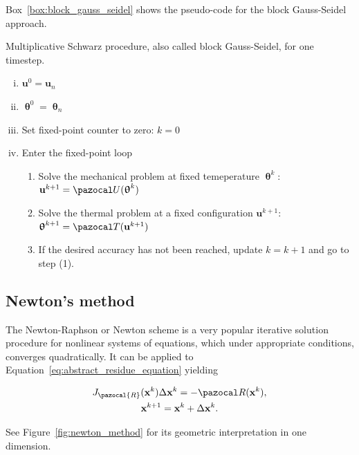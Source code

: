 Box~\ref{box:block_gauss_seidel} shows the pseudo-code for the block Gauss-Seidel approach.

\begin{framedbox}[htb]
  \caption{Multiplicative Schwarz procedure, also called block Gauss-Seidel, for one timestep.}
  \label{box:block_gauss_seidel}
  \begin{center}
    \begin{minipage}{0.9\textwidth}
    \begin{enumerate}[(i)]
    \item \(\mathbf u^0 = \mathbf u_{n}\)
    \item \(\bm \uptheta^0 = \bm \uptheta_n\)
      \item Set fixed-point counter to zero: \(k=0\)
    \item Enter the fixed-point loop
    \begin{enumerate}[(1)]
      \item Solve the mechanical problem at fixed temeperature \(\bm \uptheta^k\): \(\mathbf u^{k+1} = \pazocal U(\bm \uptheta^k)\)
      \item Solve the thermal problem at a fixed configuration \(\mathbf u^{k+1}\): \(\bm \uptheta^{k+1} = \pazocal T(\mathbf u^{k+1})\)
      \item If the desired accuracy has not been reached, update \(k=k+1\) and go to step (1).

    \end{enumerate}
    \end{enumerate}
    \end{minipage}
  \end{center}
\end{framedbox}

\subsection{Newton's method}

The Newton-Raphson or Newton scheme is a very popular iterative solution procedure for nonlinear systems of equations, which under appropriate conditions, converges quadratically.
It can be applied to Equation~\eqref{eq:abstract_residue_equation} yielding
\begin{highlight}[innertopmargin=-5pt]
  \begin{gather}
    J_\pazocal{R}(\mathbf x^k)\Delta \mathbf x^k = - \pazocal R(\mathbf x^k), \label{eq:newton_system}\\
    \mathbf x^{k+1} = \mathbf x^k + \Delta \mathbf x^k. \label{eq:newton_iter}
  \end{gather}
\end{highlight}
See Figure~\ref{fig:newton_method} for its geometric interpretation in one dimension.


